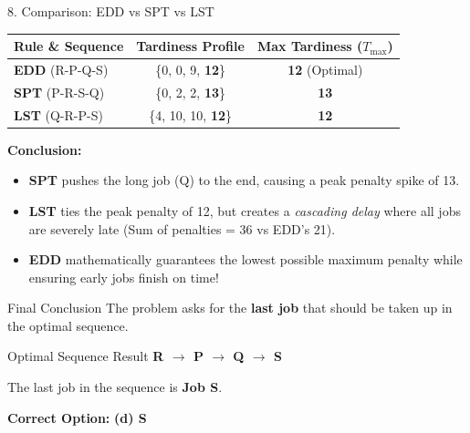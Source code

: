 \documentclass[12pt, aspectratio=169]{beamer}
\newcommand{\res}[1]{\textcolor{highlightcol}{\textbf{#1}}}
\begin{document}
\begin{frame}{8. Comparison: EDD vs SPT vs LST}
    \begin{table}[]
        \centering
        \renewcommand{\arraystretch}{1.3}
        \begin{tabular}{l c c}
            \toprule
            \textbf{Rule \& Sequence} & \textbf{Tardiness Profile} & \textbf{Max Tardiness ($T_{\max}$)} \tabularnewline
            \midrule
            \textbf{EDD} (R-P-Q-S) & \{0, 0, 9, \res{12}\} & \textbf{12} (Optimal) \tabularnewline
            \textbf{SPT} (P-R-S-Q) & \{0, 2, 2, \res{13}\} & \textbf{13} \tabularnewline
            \textbf{LST} (Q-R-P-S) & \{4, 10, 10, \res{12}\} & \textbf{12} \tabularnewline
            \bottomrule
        \end{tabular}
    \end{table}
    
    \vspace{0.3cm}
    \textbf{Conclusion:} 
    \begin{itemize}
        \item \textbf{SPT} pushes the long job (Q) to the end, causing a peak penalty spike of 13.
        \item \textbf{LST} ties the peak penalty of 12, but creates a \textit{cascading delay} where all jobs are severely late (Sum of penalties = 36 vs EDD's 21).
        \item \textbf{EDD} mathematically guarantees the lowest possible maximum penalty while ensuring early jobs finish on time!
    \end{itemize}
\end{frame}

\begin{frame}{Final Conclusion}
    The problem asks for the \textbf{last job} that should be taken up in the optimal sequence.
    
    \vspace{0.5cm}
    \begin{block}{Optimal Sequence Result}
        \centering
        \Large \textbf{R $\rightarrow$ P $\rightarrow$ Q $\rightarrow$ \res{S}}
    \end{block}
    
    \vspace{0.5cm}
    The last job in the sequence is \textbf{Job S}.
    
    \vspace{0.5cm}
    \textbf{Correct Option:} \textcolor{okgreen}{\textbf{(d) S}}
\end{frame}
\end{document}
